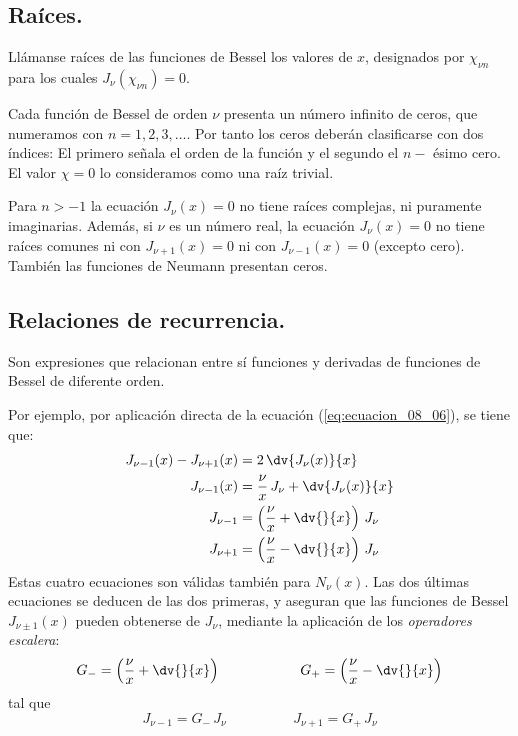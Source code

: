\subsection{Raíces.}
Llámanse raíces de las funciones de Bessel los valores de $x$, designados por $\chi_{\nu n}$ para los cuales $J_{\nu} (\chi_{\nu n}) = 0$. 
\par
Cada función de Bessel de orden $\nu$ presenta un número infinito de ceros, que numeramos con $n = 1, 2, 3, \ldots$. Por tanto los ceros deberán clasificarse con dos índices: El primero señala el orden de la función y el segundo el $n-$ ésimo cero. El valor $\chi = 0$ lo consideramos como una raíz trivial.
\par
Para $n > -1$ la ecuación $J_{\nu} (x) = 0$ no tiene raíces complejas, ni puramente imaginarias. Además, si $\nu$ es un número real, la ecuación $J_{\nu} (x) = 0$ no tiene raíces comunes ni con $J_{\nu+1} (x) = 0$ ni con $J_{\nu-1} (x) = 0$ (excepto cero). También las funciones de Neumann presentan ceros.
\subsection{Relaciones de recurrencia.}
Son expresiones que relacionan entre sí funciones y derivadas de funciones de Bessel de diferente orden.
\par
Por ejemplo, por aplicación directa de la ecuación (\ref{eq:ecuacion_08_06}), se tiene que:
\begin{align*}
J_{\nu-1} (x) - J_{\nu+1} (x)&= 2 \, \dv{J_{\nu}(x)}{x} \\
J_{\nu-1} (x) &= \dfrac{\nu}{x} \, J_{\nu} + \dv{J_{\nu}(x)}{x} \\
J_{\nu-1} &= \left( \dfrac{\nu}{x} + \dv{}{x} \right) \, J_{\nu} \\
J_{\nu+1} &= \left( \dfrac{\nu}{x} - \dv{}{x} \right) \, J_{\nu}
\end{align*}
Estas cuatro ecuaciones son válidas también para $N_{\nu} (x)$. Las dos últimas ecuaciones se deducen de las dos primeras, y aseguran que las funciones de Bessel $J_{\nu \pm 1} (x)$ pueden obtenerse de $J_{\nu}$, mediante la aplicación de los \emph{operadores escalera}:
\[ G_{-} = \left( \dfrac{\nu}{x} + \dv{}{x} \right) \hspace{2cm} G_{+} = \left( \dfrac{\nu}{x} - \dv{}{x} \right) \]
tal que
\[ J_{\nu-1} = G_{-} \, J_{\nu} \hspace{2cm} J_{\nu+1} = G_{+} \, J_{\nu}  \]
